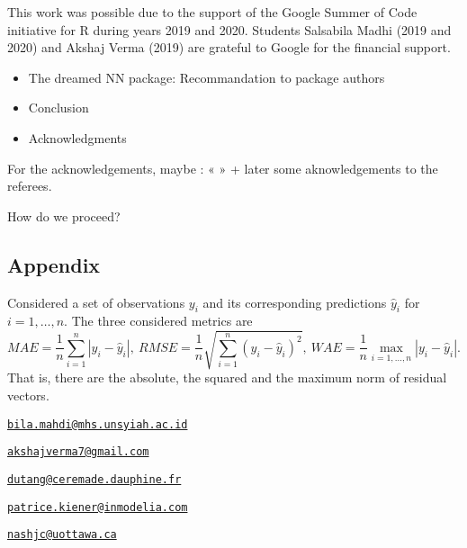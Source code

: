 This work was possible due to the support of the Google Summer of Code
initiative for R during years 2019 and 2020. Students Salsabila Madhi
(2019 and 2020) and Akshaj Verma (2019) are grateful to Google for the
financial support.



\begin{itemize}
\tightlist
\item
  The dreamed NN package: Recommandation to package authors
\item
  Conclusion
\item
  Acknowledgments
\end{itemize}

For the acknowledgements, maybe : « » + later some aknowledgements to
the referees.

How do we proceed?

\hypertarget{appendix}{%
\subsection{Appendix}\label{appendix}}

Considered a set of observations \(y_i\) and its corresponding
predictions \(\hat y_i\) for \(i=1,\dots,n\). The three considered
metrics are \[
MAE = \frac1n\sum_{i=1}^n|y_i - \hat y_i|,~
RMSE = \frac1n\sqrt{\sum_{i=1}^n(y_i - \hat y_i)^2},~
WAE = \frac1n\max_{i=1,\dots,n}|y_i - \hat y_i|.
\] That is, there are the absolute, the squared and the maximum norm of
residual vectors.


\address{%
Salsabila Mahdi\\
Universitas Syiah Kuala\\
JL. Syech Abdurrauf No.3, Aceh 23111, Indonesia\\
}
\href{mailto:bila.mahdi@mhs.unsyiah.ac.id}{\nolinkurl{bila.mahdi@mhs.unsyiah.ac.id}}

\address{%
Akshaj Verma\\
Manipal Institute of Technology\\
Navi Mumbai, Maharashtra, 400614, India\\
}
\href{mailto:akshajverma7@gmail.com}{\nolinkurl{akshajverma7@gmail.com}}

\address{%
Christophe Dutang\\
Univ. Paris-Dauphine, Univ. PSL, CNRS, CEREMADE\\
Place du Ml de Lattre de Tassigny, 75016 Paris, France\\
}
\href{mailto:dutang@ceremade.dauphine.fr}{\nolinkurl{dutang@ceremade.dauphine.fr}}

\address{%
Patrice Kiener\\
InModelia\\
5 rue Malebranche, 75005 Paris, France\\
}
\href{mailto:patrice.kiener@inmodelia.com}{\nolinkurl{patrice.kiener@inmodelia.com}}

\address{%
John C. Nash\\
Telfer School of Management, University of Ottawa\\
55 Laurier Avenue East, Ottawa, Ontario K1N 6N5 Canada\\
}
\href{mailto:nashjc@uottawa.ca}{\nolinkurl{nashjc@uottawa.ca}}
